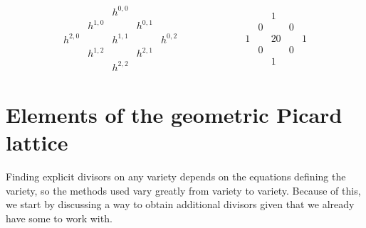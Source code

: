 \documentclass[12pt,twoside]{reedthesis}
\theoremstyle{plain}
\theoremstyle{definition}
\theoremstyle{remark}
\begin{document}
\[
\begin{matrix}
& & h^{0,0} & & \\
& h^{1,0} & & h^{0,1}&\\
h^{2,0} & &h^{1,1} & & h^{0,2}\\
& h^{1,2} & & h^{2,1} &\\
& & h^{2,2} & &
\end{matrix}
\hspace{1in}
\begin{matrix}
& & 1 & & \\
& 0 & & 0 &\\
1 & & 20 & & 1\\
& 0 & & 0 &\\
& & 1 & &
\end{matrix}
\]
\section{Elements of the geometric Picard lattice}
Finding explicit divisors on any variety depends on the equations defining the variety, so the methods used vary greatly from variety to variety. Because of this, we start by discussing a way to obtain  additional divisors given that we already have some to work with.
\end{document}
